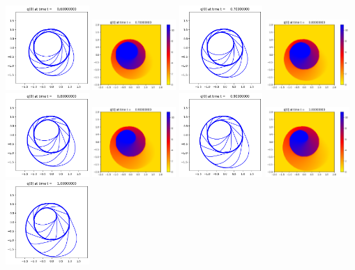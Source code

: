 \documentclass[11pt]{article}
\begin{document}
\includegraphics[width=0.2375\textwidth]{frame0006fig1.png}
\includegraphics[width=0.2375\textwidth]{frame0007fig0.png}
\includegraphics[width=0.2375\textwidth]{frame0007fig1.png}
\vskip 10pt 
\includegraphics[width=0.2375\textwidth]{frame0008fig0.png}
\includegraphics[width=0.2375\textwidth]{frame0008fig1.png}
\includegraphics[width=0.2375\textwidth]{frame0009fig0.png}
\includegraphics[width=0.2375\textwidth]{frame0009fig1.png}
\vskip 10pt 
\includegraphics[width=0.2375\textwidth]{frame0010fig0.png}
\includegraphics[width=0.2375\textwidth]{frame0010fig1.png}
\end{document}

